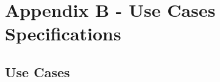 %

\chapter{Appendix B - Use Cases Specifications}
\label{ann:use_cases_annex}

\section*{Use Cases}


